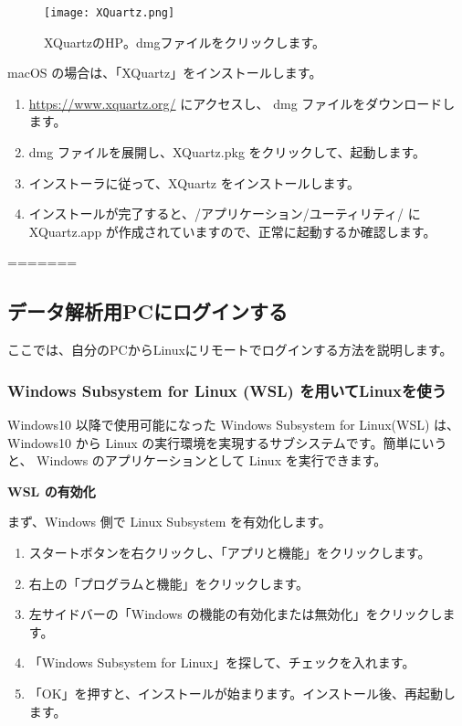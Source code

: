 \begin{figure}[h]
  \begin{center}
    \texttt{[image: XQuartz.png]}
    \caption{XQuartzのHP。dmgファイルをクリックします。}
  \end{center}
\end{figure}

macOS の場合は、「XQuartz」をインストールします。
\begin{enumerate}
  \item \url{https://www.xquartz.org/} にアクセスし、 dmg ファイルをダウンロードします。
  \item dmg ファイルを展開し、XQuartz.pkg をクリックして、起動します。
  \item インストーラに従って、XQuartz をインストールします。
  \item インストールが完了すると、/アプリケーション/ユーティリティ/ に XQuartz.app が作成されていますので、正常に起動するか確認します。
\end{enumerate}
=======

\subsection{データ解析用PCにログインする}
ここでは、自分のPCからLinuxにリモートでログインする方法を説明します。

\subsubsection{Windows Subsystem for Linux (WSL) を用いてLinuxを使う}
Windows10 以降で使用可能になった Windows Subsystem for Linux(WSL) は、 Windows10 から Linux の実行環境を実現するサブシステムです。簡単にいうと、 Windows のアプリケーションとして Linux を実行できます。

\vspace{1cm}
{\large \bf WSL の有効化}
\vspace{0.5cm}

まず、Windows 側で Linux Subsystem を有効化します。
\begin{enumerate}
  \item スタートボタンを右クリックし、「アプリと機能」をクリックします。
  \item 右上の「プログラムと機能」をクリックします。
  \item 左サイドバーの「Windows の機能の有効化または無効化」をクリックします。
  \item 「Windows Subsystem for Linux」を探して、チェックを入れます。
  \item 「OK」を押すと、インストールが始まります。インストール後、再起動します。
\end{enumerate}


